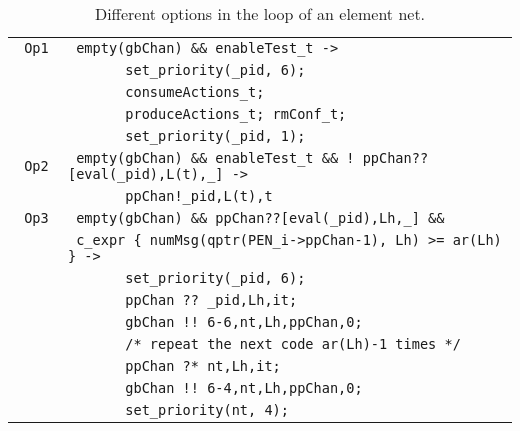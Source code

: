 \documentclass{llncs}
\begin{document}
\small
\begin{table}[h!]
\begin{center}\begin{tabular}{|l|l|}
      \hline
      \verb" Op1 "  & \verb" empty(gbChan) && enableTest_t -> "  \\
                    & \verb"       set_priority(_pid, 6);"  \\
                    & \verb"       consumeActions_t;"  \\
                    & \verb"       produceActions_t; rmConf_t;"  \\
                    & \verb"       set_priority(_pid, 1);"  \\
      \hline
      \verb" Op2 "  & \verb" empty(gbChan) && enableTest_t && ! ppChan??[eval(_pid),L(t),_] ->  "\\
                    & \verb"       ppChan!_pid,L(t),t" \\
      \hline
      \verb" Op3 "  & \verb" empty(gbChan) && ppChan??[eval(_pid),Lh,_] && "  \\
                    & \verb" c_expr { numMsg(qptr(PEN_i->ppChan-1), Lh) >= ar(Lh) } ->  "  \\
                    & \verb"       set_priority(_pid, 6);"  \\
                    & \verb"       ppChan ?? _pid,Lh,it; "  \\
                    & \verb"       gbChan !! 6-6,nt,Lh,ppChan,0; "  \\
                    & \verb"       /* repeat the next code ar(Lh)-1 times */ "  \\
                    & \verb"       ppChan ?* nt,Lh,it; "  \\
                    & \verb"       gbChan !! 6-4,nt,Lh,ppChan,0; "  \\
                    & \verb"       set_priority(nt, 4);"  \\
      \hline
\end{tabular}\end{center}
\caption{Different options in the loop of an element net.}
\label{tab.opt.el.net.imp.p}
\end{table}
\normalsize
\end{document}
